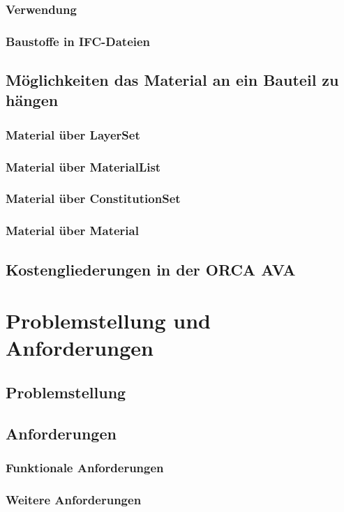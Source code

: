 \subsubsection{Verwendung}
\subsubsection{Baustoffe in IFC-Dateien}
\subsection{Möglichkeiten das Material an ein Bauteil zu hängen}
\subsubsection{Material über LayerSet}
\subsubsection{Material über MaterialList}
\subsubsection{Material über ConstitutionSet}
\subsubsection{Material über Material}
\subsection{Kostengliederungen in der ORCA AVA}

\section{Problemstellung und Anforderungen}
\subsection{Problemstellung}
\subsection{Anforderungen}
\subsubsection{Funktionale Anforderungen}
\subsubsection{Weitere Anforderungen}

